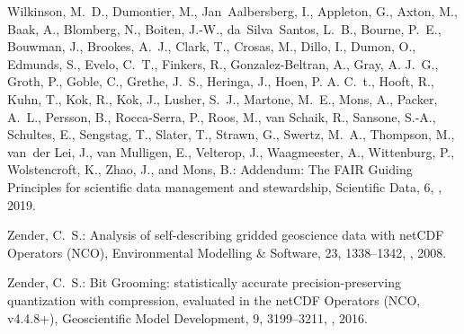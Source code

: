 \documentclass[essd,manuscript]{copernicus}
\begin{document}
\begin{thebibliography}{52}
Wilkinson, M.~D., Dumontier, M., Jan~Aalbersberg, I., Appleton, G., Axton, M.,
  Baak, A., Blomberg, N., Boiten, J.-W., da~Silva~Santos, L.~B., Bourne, P.~E.,
  Bouwman, J., Brookes, A.~J., Clark, T., Crosas, M., Dillo, I., Dumon, O.,
  Edmunds, S., Evelo, C.~T., Finkers, R., Gonzalez-Beltran, A., Gray, A. J.~G.,
  Groth, P., Goble, C., Grethe, J.~S., Heringa, J., Hoen, P. A. C.~t., Hooft,
  R., Kuhn, T., Kok, R., Kok, J., Lusher, S.~J., Martone, M.~E., Mons, A.,
  Packer, A.~L., Persson, B., Rocca-Serra, P., Roos, M., van Schaik, R.,
  Sansone, S.-A., Schultes, E., Sengstag, T., Slater, T., Strawn, G., Swertz,
  M.~A., Thompson, M., van~der Lei, J., van Mulligen, E., Velterop, J.,
  Waagmeester, A., Wittenburg, P., Wolstencroft, K., Zhao, J., and Mons, B.:
  Addendum: The FAIR Guiding Principles for scientific data management and
  stewardship, Scientific Data, 6, , 2019.

Zender, C.~S.: Analysis of self-describing gridded geoscience data with netCDF
  Operators (NCO), Environmental Modelling \& Software, 23, 1338–1342,
  , 2008.

Zender, C.~S.: Bit Grooming: statistically accurate precision-preserving
  quantization with compression, evaluated in the netCDF Operators (NCO,
  v4.4.8+), Geoscientific Model Development, 9, 3199–3211,
  , 2016.

\end{thebibliography}
\end{document}
